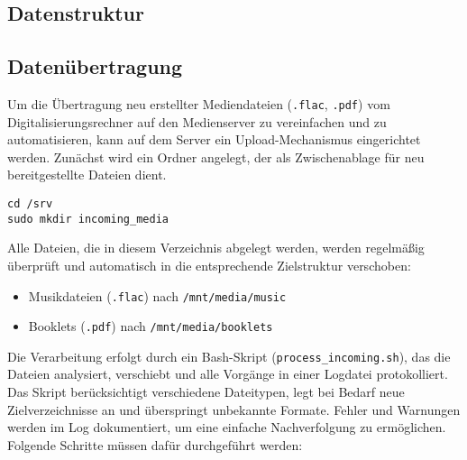 \documentclass[12pt,a4paper]{report}
\begin{document}
    \subsection{Datenstruktur}

    \subsection{Datenübertragung}
    Um die Übertragung neu erstellter Mediendateien (\texttt{.flac}, \texttt{.pdf}) vom Digitalisierungsrechner auf den Medienserver zu vereinfachen 
    und zu automatisieren, kann auf dem Server ein Upload-Mechanismus eingerichtet werden. 
    Zunächst wird ein Ordner angelegt, der als Zwischenablage für neu bereitgestellte Dateien dient. 

  \begin{verbatim}
cd /srv
sudo mkdir incoming_media
  \end{verbatim}

  Alle Dateien, die in diesem Verzeichnis abgelegt werden, werden regelmäßig überprüft 
  und automatisch in die entsprechende Zielstruktur verschoben:
  \begin{itemize}
    \item Musikdateien (\texttt{.flac}) nach \texttt{/mnt/media/music}
    \item Booklets (\texttt{.pdf}) nach \texttt{/mnt/media/booklets}
  \end{itemize}

  Die Verarbeitung erfolgt durch ein Bash-Skript (\texttt{process\_incoming.sh}), das die Dateien analysiert, 
  verschiebt und alle Vorgänge in einer Logdatei protokolliert. 
  Das Skript berücksichtigt verschiedene Dateitypen, legt bei Bedarf neue Zielverzeichnisse an und überspringt unbekannte Formate. 
  Fehler und Warnungen werden im Log dokumentiert, um eine einfache Nachverfolgung zu ermöglichen.
  Folgende Schritte müssen dafür durchgeführt werden:
\end{document}
